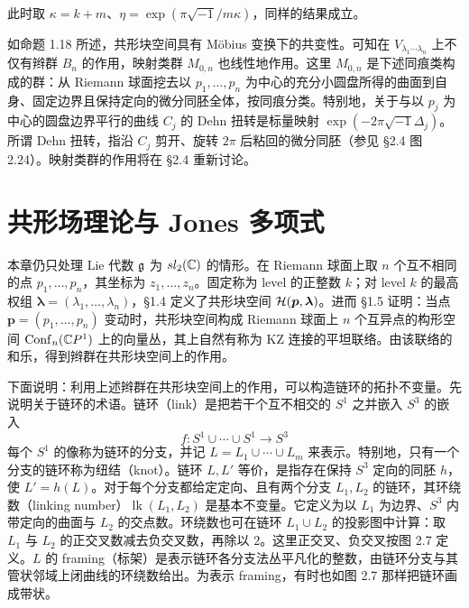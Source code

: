 
此时取 $\kappa=k+m$、$\eta=\exp(\pi\sqrt{-1}/m\kappa)$，同样的结果成立。

如命题 1.18 所述，共形块空间具有 Möbius 变换下的共变性。可知在 $V_{\lambda_1\cdots\lambda_n}$ 上不仅有辫群 $B_n$ 的作用，映射类群 $M_{0,n}$ 也线性地作用。这里 $M_{0,n}$ 是下述同痕类构成的群：从 Riemann 球面挖去以 $p_1,\dots,p_n$ 为中心的充分小圆盘所得的曲面到自身、固定边界且保持定向的微分同胚全体，按同痕分类。特别地，关于与以 $p_j$ 为中心的圆盘边界平行的曲线 $C_j$ 的 Dehn 扭转是标量映射 $\exp(-2\pi\sqrt{-1}\Delta_j)$。所谓 Dehn 扭转，指沿 $C_j$ 剪开、旋转 $2\pi$ 后粘回的微分同胚（参见 §2.4 图 2.24）。映射类群的作用将在 §2.4 重新讨论。

\section{共形场理论与 Jones 多项式}


本章仍只处理 Lie 代数 $\mathfrak{g}$ 为 $sl_2(\mathbb{C})$ 的情形。在 Riemann 球面上取 $n$ 个互不相同的点 $p_1,\dots,p_n$，其坐标为 $z_1,\dots,z_n$。固定称为 level 的正整数 $k$；对 level $k$ 的最高权组 $\bm{\lambda}=(\lambda_1,\dots,\lambda_n)$，§1.4 定义了共形块空间 $\mathcal{H}(\bm{p},\bm{\lambda})$。进而 §1.5 证明：当点 $\bm{p}=(p_1,\dots,p_n)$ 变动时，共形块空间构成 Riemann 球面上 $n$ 个互异点的构形空间 $\operatorname{Conf}_n(\mathbb{C}P^1)$ 上的向量丛，其上自然有称为 KZ 连接的平坦联络。由该联络的和乐，得到辫群在共形块空间上的作用。

下面说明：利用上述辫群在共形块空间上的作用，可以构造链环的拓扑不变量。先说明关于链环的术语。链环（link）是把若干个互不相交的 $S^1$ 之并嵌入 $S^3$ 的嵌入
\[
  f: S^1\cup\cdots\cup S^1 \longrightarrow S^3
\]
每个 $S^1$ 的像称为链环的分支，并记 $L=L_1\cup\cdots\cup L_m$
来表示。特别地，只有一个分支的链环称为纽结（knot）。链环 $L,L'$ 等价，是指存在保持 $S^3$ 定向的同胚 $h$，使 $L'=h(L)$。对于每个分支都给定定向、且有两个分支 $L_1,L_2$ 的链环，其环绕数（linking number）$\operatorname{lk}(L_1,L_2)$ 是基本不变量。它定义为以 $L_1$ 为边界、$S^3$ 内带定向的曲面与 $L_2$ 的交点数。环绕数也可在链环 $L_1\cup L_2$ 的投影图中计算：取 $L_1$ 与 $L_2$ 的正交叉数减去负交叉数，再除以 $2$。这里正交叉、负交叉按图 2.7 定义。$L$ 的 framing（标架）是表示链环各分支法丛平凡化的整数，由链环分支与其管状邻域上闭曲线的环绕数给出。为表示 framing，有时也如图 2.7 那样把链环画成带状。

